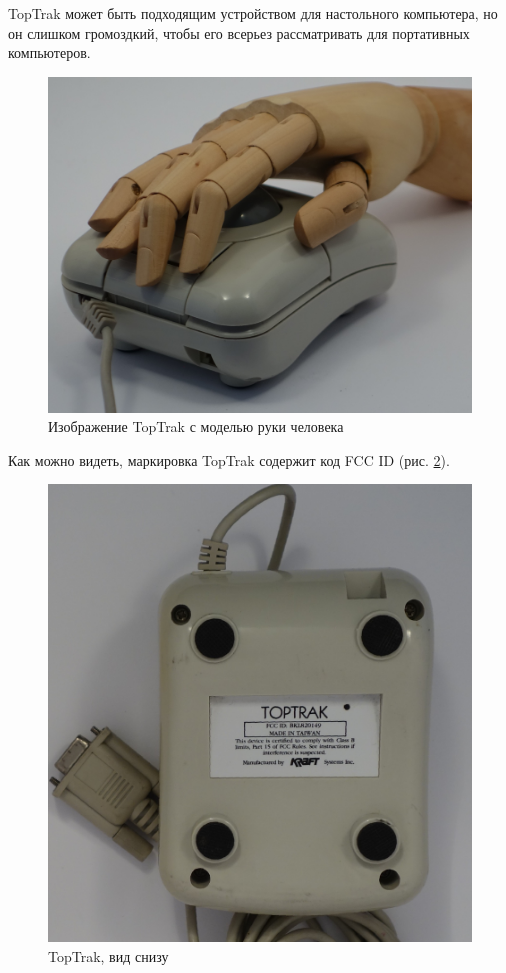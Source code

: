 \documentclass[11pt, a4paper]{article}
\begin{document}
TopTrak может быть подходящим устройством для настольного компьютера, но он слишком громоздкий, чтобы его всерьез рассматривать для портативных компьютеров.

\begin{figure}[h]
    \centering
    \includegraphics[scale=0.45]{1990_kraft_toptrack/2.5.jpg}
    \caption{Изображение TopTrak с моделью руки человека}
    \label{fig:TopTrakHand}
\end{figure}

Как можно видеть, маркировка TopTrak содержит код FCC ID (рис. \ref{fig:TopTrakBottom}).

\begin{figure}[htpb]
    \centering
    \includegraphics[scale=0.4]{1990_kraft_toptrack/2.10.jpg}
    \caption{TopTrak, вид снизу}
    \label{fig:TopTrakBottom}
\end{figure}
\end{document}
